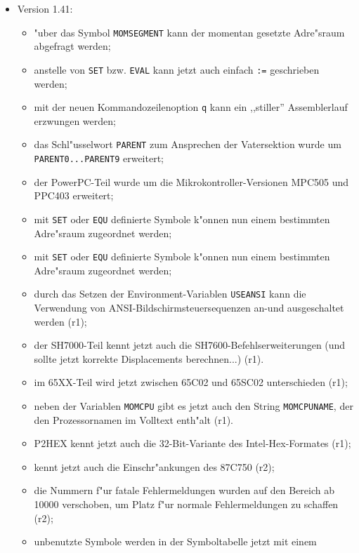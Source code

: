 \documentclass[12pt,a4paper,twoside]{report}
\newcommand{\tty}[1]{{\tt #1}}
\begin{document}
\begin{itemize}
{\begin{itemize}
{            Notation geschrieben werden (r9).}
      \end{itemize}}
\item{Version 1.41:
      \begin{itemize}
      \item{"uber das Symbol \tty{MOMSEGMENT} kann der momentan
            gesetzte Adre"sraum abgefragt werden;}
      \item{anstelle von \tty{SET} bzw. \tty{EVAL} kann jetzt auch
            einfach \tty{:=} geschrieben werden;}
      \item{mit der neuen Kommandozeilenoption \tty{q} kann ein ,,stiller''
            Assemblerlauf erzwungen werden;}
      \item{das Schl"usselwort \tty{PARENT} zum Ansprechen der
            Vatersektion wurde um \tty{PARENT0...PARENT9} erweitert;}
      \item{der PowerPC-Teil wurde um die Mikrokontroller-Versionen
            MPC505 und PPC403 erweitert;}
      \item{mit \tty{SET} oder \tty{EQU} definierte Symbole k"onnen
            nun einem bestimmten Adre"sraum zugeordnet werden;}
      \item{mit \tty{SET} oder \tty{EQU} definierte Symbole k"onnen
            nun einem bestimmten Adre"sraum zugeordnet werden;}
      \item{durch das Setzen der Environment-Variablen \tty{USEANSI}
            kann die Verwendung von ANSI-Bildschirmsteuersequenzen
            an-und ausgeschaltet werden (r1);}
      \item{der SH7000-Teil kennt jetzt auch die SH7600-Befehlserweiterungen
            (und sollte jetzt korrekte Displacements berechnen...) (r1).}
      \item{im 65XX-Teil wird jetzt zwischen 65C02 und 65SC02 unterschieden
            (r1);}
      \item{neben der Variablen \tty{MOMCPU} gibt es jetzt auch den String
            \tty{MOMCPUNAME}, der den Prozessornamen im Volltext enth"alt (r1).}
      \item{P2HEX kennt jetzt auch die 32-Bit-Variante des
            Intel-Hex-Formates (r1);}
      \item{kennt jetzt auch die Einschr"ankungen des 87C750 (r2);}
      \item{die Nummern f"ur fatale Fehlermeldungen wurden auf den Bereich
            ab 10000 verschoben, um Platz f"ur normale Fehlermeldungen zu
	    schaffen (r2);}
      \item{unbenutzte Symbole werden in der Symboltabelle jetzt mit einem
}
\end{itemize}}
\end{itemize}
\end{document}
